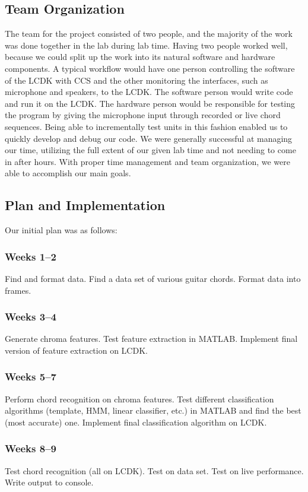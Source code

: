 \documentclass[journal]{IEEEtran}
\begin{document}
\subsection{Team Organization}
The team for the project consisted of two people, and the majority of the work was done together in the lab during lab time.
Having two people worked well, because we could split up the work into its natural software and hardware components.
A typical workflow would have one person controlling the software of the LCDK with CCS and the other monitoring the interfaces, such as microphone and speakers, to the LCDK.
The software person would write code and run it on the LCDK.
The hardware person would be responsible for testing the program by giving the microphone input through recorded or live chord sequences.
Being able to incrementally test units in this fashion enabled us to quickly develop and debug our code.
We were generally successful at managing our time, utilizing the full extent of our given lab time and not needing to come in after hours.
With proper time management and team organization, we were able to accomplish our main goals.


\subsection{Plan and Implementation}
Our initial plan was as follows:

\subsubsection*{Weeks 1--2}
Find and format data.
Find a data set of various guitar chords.
Format data into frames.

\subsubsection*{Weeks 3--4}
Generate chroma features.
Test feature extraction in MATLAB.
Implement final version of feature extraction on LCDK.

\subsubsection*{Weeks 5--7}
Perform chord recognition on chroma features.
Test different classification algorithms (template, HMM, linear classifier, etc.) in MATLAB and find the best (most accurate) one.
Implement final classification algorithm on LCDK.

\subsubsection*{Weeks 8--9}
Test chord recognition (all on LCDK).
Test on data set.
Test on live performance.
Write output to console.
\end{document}

